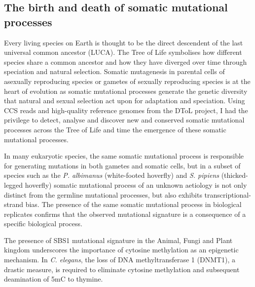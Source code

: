 
\subsection{The birth and death of somatic mutational processes}

Every living species on Earth is thought to be the direct descendent of the last universal common ancestor (LUCA). The Tree of Life symbolises how different species share a common ancestor and how they have diverged over time through speciation and natural selection. Somatic mutagenesis in parental cells of asexually reproducing species or gametes of sexually reproducing species is at the heart of evolution as somatic mutational processes generate the genetic diversity that natural and sexual selection act upon for adaptation and speciation. Using CCS reads and high-quality reference genomes from the DToL project, I had the privilege to detect, analyse and discover new and conserved somatic mutational processes across the Tree of Life and time the emergence of these somatic mutational processes. 

In many eukaryotic species, the same somatic mutational process is responsible for generating mutations in both gametes and somatic cells, but in a subset of species such as the \textit{P. albimanus} (white-footed hoverfly) and \textit{S. pipiens} (thicked-legged hoverfly) somatic mutational process of an unknown aetiology is not only distinct from the germline mutational processes, but also exhibits transcriptional-strand bias. The presence of the same somatic mutational process in biological replicates confirms that the observed mutational signature is a consequence of a specific biological process. 

The presence of SBS1 mutational signature in the Animal, Fungi and Plant kingdom underscores the importance of cytosine methylation as an epigenetic mechanism. In \textit{C. elegans}, the loss of DNA methyltransferase 1 (DNMT1), a drastic measure, is required to eliminate cytosine methylation and subsequent deamination of 5mC to thymine. 


